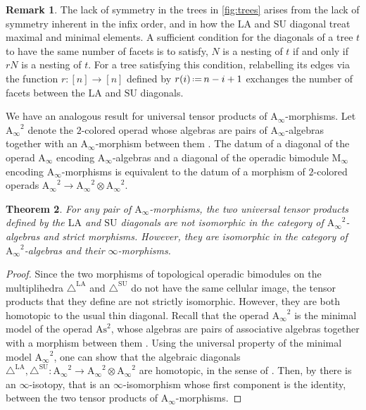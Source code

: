 \documentclass{amsart}
\newtheorem{theorem}{Theorem}[section]
\theoremstyle{definition}
\newtheorem{remark}[theorem]{Remark}
\newcommand{\eqdef}{\mbox{\,\raisebox{0.2ex}{\scriptsize\ensuremath{\mathrm:}}\ensuremath{=}\,}} %
\newcommand{\SU}{\mathrm{SU}}
\newcommand{\LA}{\mathrm{LA}}
\newcommand{\SUD}{\triangle^{\mathrm{SU}}}
\newcommand{\LAD}{\triangle^{\mathrm{LA}}}
\newcommand{\Ainf}{\ensuremath{\mathrm{A}_\infty}}
\begin{document}
\begin{remark}
The lack of symmetry in the trees in \cref{fig:trees} arises from the lack of symmetry inherent in the infix order, and in how the $\LA$ and $\SU$ diagonal treat maximal and minimal elements.
A sufficient condition for the diagonals of a tree $t$ to have the same number of facets is to satisfy, $N$ is a nesting of $t$ if and only if $rN$ is a nesting of $t$.
For a tree satisfying this condition, relabelling its edges via the function $r : [n]\to [n]$ defined by $r(i)\eqdef n-i+1$ exchanges the number of facets between the $\LA$ and $\SU$ diagonals.
\end{remark}

We have an analogous result for universal tensor products of $\Ainf$-morphisms. 
Let $\Ainf^2$ denote the $2$-colored operad whose algebras are pairs of $\Ainf$-algebras together with an $\Ainf$-morphism between them \cite[Sec.~4.4.1]{LaplanteAnfossiMazuir}.
The datum of a diagonal of the operad $\Ainf$ encoding $\Ainf$-algebras and a diagonal of the operadic bimodule $\mathrm{M}_\infty$ encoding $\Ainf$-morphisms is equivalent to the datum of a morphism of $2$-colored operads $\Ainf^2 \to \Ainf^2 \otimes \Ainf^2$. 

\begin{theorem}
	\label{thm:infinity-iso-2}
	For any pair of $\Ainf$-morphisms, the two universal tensor products defined by the $\LA$ and $\SU$ diagonals are not isomorphic in the category of $\Ainf^2$-algebras and strict morphisms.
	However, they are isomorphic in the category of $\Ainf^2$-algebras and their $\infty$-morphisms.
\end{theorem}

\begin{proof}
	Since the two morphisms of topological operadic bimodules on the multiplihedra $\LAD$ and $\SUD$ do not have the same cellular image, the tensor products that they define are not strictly isomorphic.
	However, they are both homotopic to the usual thin diagonal.
	Recall that the operad $\Ainf^2$ is the minimal model of the operad $\mathrm{As}^2$, whose algebras are pairs of associative algebras together with a morphism between them \cite[Prop.~4.9]{LaplanteAnfossi}. 
	Using the universal property of the minimal model $\Ainf^2$, one can show that the algebraic diagonals $\LAD,\SUD : \Ainf^2 \to \Ainf^2 \otimes \Ainf^2$ are homotopic, in the sense of \cite[Sec.~3.10]{MarklShniderStasheff}.
	Then, by \cite[Cor.~2]{DotsenkoShadrinVallette} there is an $\infty$-isotopy, that is an $\infty$-isomorphism whose first component is the identity, between the two tensor products of $\Ainf$-morphisms.
\end{proof}
\end{document}
